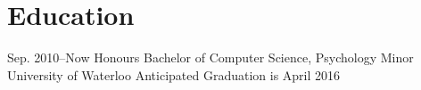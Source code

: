 \documentclass[]{friggeri-cv} %
\begin{document}

\section{Education}

\begin{sectionlist}
		
	\entry
	{Sep. 2010--Now}
	{Honours Bachelor of Computer Science, Psychology Minor}
	{University of Waterloo}
	{Anticipated Graduation is April 2016}
\end{sectionlist}
\end{document}
